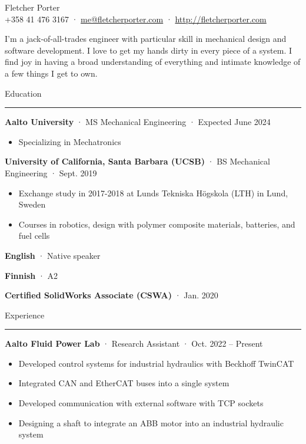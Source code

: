 \documentclass[12pt, oneside]{article}
\newcommand{\titlestyle}[1] {
	{\fontsize{40pt}{1em}\selectfont \textcolor{new_red}{\textsf{#1}}} \\
}
\newcommand{\headingstyleJobs}[1] {
	{\fontsize{18pt}{1em}\selectfont \textcolor{new_red}{\textsf{#1}}}
	\textcolor{new_red}{\rule{3.25in}{0.5pt}} \vspace{3pt}
}
\newcommand{\infostyle}[1] {
	{\selectfont #1} \\ %
}
\newcommand{\jobtitle}[3] {
	{\bf #1} · {#2} · {#3} \vspace{-7pt} \\
}
\newcommand{\certification}[2] {
	{\bf #1} · {#2}
}
\renewenvironment{quote}{%
  \list{}{%
    \leftmargin4pt
    \rightmargin\leftmargin
  }
  \item\relax
}
{\endlist}
\newcommand{\overview}[1] {
	\begin{quote}
		#1
	\end{quote}
}
\begin{document}
\begin{flushleft}



\titlestyle{Fletcher Porter}
\infostyle{+358 41 476 3167 · \href{mailto:me@fletcherporter.com}{me@fletcherporter.com} · \url{http://fletcherporter.com}}

\overview{
I'm a jack-of-all-trades engineer with particular skill in mechanical design and software
development.  I love to get my hands dirty in every piece
of a system.  I find joy in having a broad understanding of everything and
intimate knowledge of a few things I get to own.
}

\headingstyleJobs{Education}

\jobtitle{Aalto University}{MS Mechanical Engineering}{Expected June 2024}
\begin{itemize}
    \item Specializing in Mechatronics
\end{itemize}

\jobtitle{University of California, Santa Barbara (UCSB)}{BS Mechanical Engineering}{Sept. 2019}
\begin{itemize}
	\item Exchange study in 2017-2018 at Lunds Tekniska Högskola (LTH) in Lund, Sweden \\
	\item Courses in robotics, design with polymer composite materials, batteries, and fuel cells
\end{itemize}


\certification{English}{Native speaker} \certification{Finnish}{A2} \vspace{5pt}

\certification{Certified SolidWorks Associate (CSWA)}{Jan. 2020} \vspace{5pt}


\headingstyleJobs{Experience}

\jobtitle{Aalto Fluid Power Lab}{Research Assistant}{Oct. 2022 – Present}
\begin{itemize}
	\item Developed control systems for industrial hydraulics with Beckhoff TwinCAT \\
	\item Integrated CAN and EtherCAT buses into a single system \\
	\item Developed communication with external software with TCP sockets \\
	\item Designing a shaft to integrate an ABB motor into an industrial hydraulic system
\end{itemize}


\end{flushleft}
\end{document}
